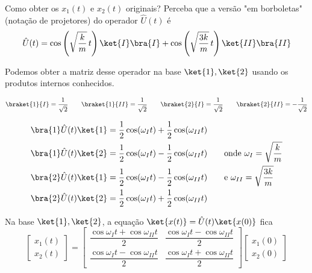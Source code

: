 Como obter os $x_1(t)$ e $x_2(t)$ originais? Perceba que a versão "em borboletas" (notação de projetores) do operador $\hat{U}(t)$ é
\begin{equation}
    \hat{U}(t) = \cos\left(\sqrt{\frac{k}{m}}\, t\right) \ket{I}\bra{I} + \cos\left(\sqrt{\frac{3k}{m}}\, t\right) \ket{II}\bra{II}
    \label{eq:aula5_operador_evolucao}
\end{equation}

Podemos obter a matriz desse operador na base $\ket{1}, \ket{2}$ usando os produtos internos conhecidos.

\[
\braket{1}{I} = \frac{1}{\sqrt{2}} \qquad \braket{1}{II} = \frac{1}{\sqrt{2}} \qquad \braket{2}{I} = \frac{1}{\sqrt{2}} \qquad \braket{2}{II} = -\frac{1}{\sqrt{2}}
\]

\begin{align}
    \bra{1}\hat{U}(t)\ket{1} &= \frac{1}{2}\cos(\omega_I t) + \frac{1}{2}\cos(\omega_{II} t) \\
    \bra{1}\hat{U}(t)\ket{2} &= \frac{1}{2}\cos(\omega_I t) - \frac{1}{2}\cos(\omega_{II} t) \qquad \text{onde } \omega_I = \sqrt{\frac{k}{m}} \\
    \bra{2}\hat{U}(t)\ket{1} &= \frac{1}{2}\cos(\omega_I t) - \frac{1}{2}\cos(\omega_{II} t) \qquad \text{e } \omega_{II} = \sqrt{\frac{3k}{m}} \\
    \bra{2}\hat{U}(t)\ket{2} &= \frac{1}{2}\cos(\omega_I t) + \frac{1}{2}\cos(\omega_{II} t)
\end{align}

Na base $\ket{1}, \ket{2}$, a equação $\ket{x(t)} = \hat{U}(t)\ket{x(0)}$ fica
\begin{equation}
    \begin{bmatrix} x_1(t) \\ x_2(t) \end{bmatrix}
    =
    \begin{bmatrix}
    \dfrac{\cos\omega_I t + \cos\omega_{II} t}{2} & \dfrac{\cos\omega_I t - \cos\omega_{II} t}{2} \\[8pt]
    \dfrac{\cos\omega_I t - \cos\omega_{II} t}{2} & \dfrac{\cos\omega_I t + \cos\omega_{II} t}{2}
    \end{bmatrix}
    \begin{bmatrix} x_1(0) \\ x_2(0) \end{bmatrix}
    \label{eq:aula5_propagador_x1x2}
\end{equation}

\begin{center}
\end{center}

